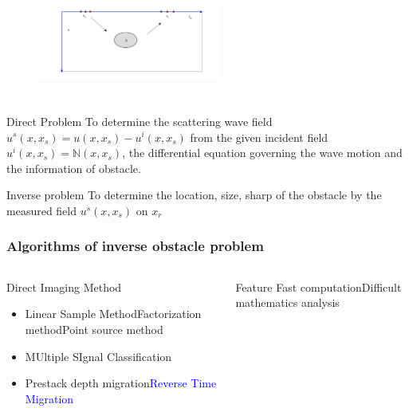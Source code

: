 \documentclass[cjk,8pt]{beamer}
\newcommand{\N}{\mathbb{N}}
\begin{document}
\begin{CJK*}{GBK}{kai}
\begin{frame}
\begin{columns}
\begin{column}{.5\textwidth}
\begin{figure}
  \centering
  \includegraphics[width=6cm,height=3cm]{./figure/half_forward}
\end{figure}
\end{column}
\end{columns}
\begin{block}{Direct Problem}
To determine the scattering wave field $u^s(x,x_s)=u(x,x_s)-u^i(x,x_s)$ from the given incident field $u^i(x,x_s)=\N(x,x_s)$,
the differential equation governing the wave motion and the information of obstacle.
\end{block}
\begin{block}{Inverse problem}
To determine the location, size, sharp of the obstacle by the measured field $u^s(x,x_s)$ on $x_r$
\end{block}
\end{frame}


\begin{frame}
\frametitle{Algorithms of inverse obstacle problem}
\begin{columns}


\begin{block}{Direct Imaging Method}
\begin{itemize}
  \item Linear Sample MethodFactorization methodPoint source method
  \item MUltiple SIgnal Classification
  \item Prestack depth migration\textcolor{blue}{Reverse Time Migration}
\end{itemize}

\end{block}
\begin{block}{Feature}
  Fast computationDifficult mathematics analysis
\end{block}


\end{columns}
\end{frame}
\end{CJK*}
\end{document}
